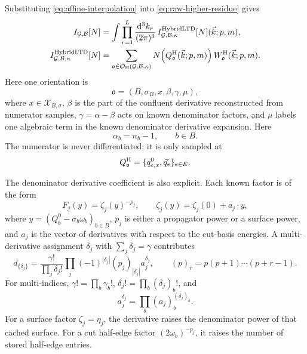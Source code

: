 \documentclass[11pt,a4paper]{report}
\newcommand{\dd}{\mathrm{d}}
\newcommand{\Graph}{\mathcal G}
\newcommand{\Basis}{\mathcal B}
\newcommand{\Orient}{\mathcal O}
\newcommand{\Samples}{\mathcal X}
\begin{document}
Substituting \eqref{eq:affine-interpolation} into
\eqref{eq:raw-higher-residue} gives
\begin{align}
  I_{\Graph,\Basis}[N]
  &=
  \int \prod_{r=1}^{L}\frac{\dd^3 k_r}{(2\pi)^3}\,
  I^{\rm HybridLTD}_{\Graph,\Basis,\kappa}[N](\vec k;p,m),
  \label{eq:spatial-hybrid-integral}\\
  I^{\rm HybridLTD}_{\Graph,\Basis,\kappa}[N]
  &=
  \sum_{\mathfrak o\in\Orient_{\rm H}(\Graph,\Basis,\kappa)}
  N\!\left(Q_{\mathfrak o}^{\rm H}(\vec k;p,m)\right)
  W_{\mathfrak o}^{\rm H}(\vec k;p,m).
  \label{eq:hybrid-master}
\end{align}
Here one orientation is
\[
  \mathfrak o=(B,\sigma_B,x,\beta,\gamma,\mu),
\]
where \(x\in\Samples_{B,\sigma}\), \(\beta\) is the part of the confluent
derivative reconstructed from numerator samples, \(\gamma=\alpha-\beta\) acts
on known denominator factors, and \(\mu\) labels one algebraic term in the
known denominator derivative expansion.  Here
\[
  \alpha_b=n_b-1,\qquad b\in B.
\]
The numerator is never differentiated; it is only sampled at
\[
  Q_{\mathfrak o}^{\rm H}=\{q_{e,x}^0,\vec q_e\}_{e\in E}.
\]

The denominator derivative coefficient is also explicit.  Each known factor is
of the form
\[
  F_j(y)=\zeta_j(y)^{-p_j},\qquad
  \zeta_j(y)=\zeta_j(0)+a_j\cdot y,
\]
where \(y=(Q_b^0-\sigma_b\omega_b)_{b\in B}\), \(p_j\) is either a propagator
power or a surface power, and \(a_j\) is the vector of derivatives with respect
to the cut-basis energies.  A multi-derivative assignment
\(\delta_j\) with \(\sum_j\delta_j=\gamma\) contributes
\begin{equation}
  d_{\{\delta_j\}}
  =
  \frac{\gamma!}{\prod_j\delta_j!}
  \prod_j
  (-1)^{|\delta_j|}
  (p_j)_{|\delta_j|}
  a_j^{\delta_j},
  \qquad
  (p)_r=p(p+1)\cdots(p+r-1).
  \label{eq:denominator-derivative-coeff}
\end{equation}
For multi-indices,
\(\gamma!=\prod_b\gamma_b!\),
\(\delta_j!=\prod_b(\delta_j)_b!\), and
\[
  a_j^{\delta_j}=\prod_b (a_j)_b^{(\delta_j)_b}.
\]
For a surface factor \(\zeta_j=\eta_j\), the derivative raises the denominator
power of that cached surface.  For a cut half-edge factor
\((2\omega_b)^{-p_j}\), it raises the number of stored half-edge entries.
\end{document}
